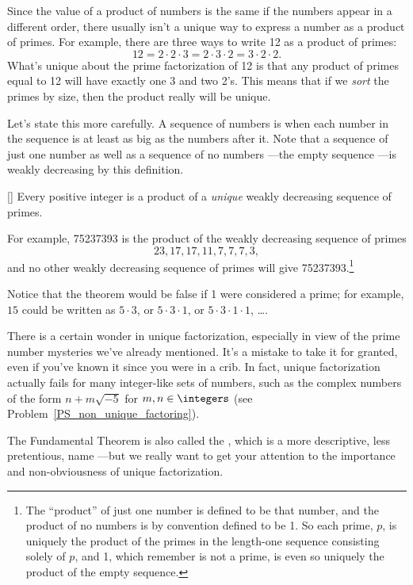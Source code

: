 Since the value of a product of numbers is the same if the numbers
appear in a different order, there usually isn't a unique way to
express a number as a product of primes.  For example, there are three
ways to write 12 as a product of primes:
\[
12 = 2 \cdot 2 \cdot 3 = 2 \cdot 3 \cdot 2 = 3 \cdot 2 \cdot 2.
\]
What's unique about the prime factorization of 12 is that any product
of primes equal to 12 will have exactly one 3 and two 2's.  This means
that if we \emph{sort} the primes by size, then the product really
will be unique.

Let's state this more carefully.  A sequence of numbers is
\emph{} when each number in the sequence is at
least as big as the numbers after it.  Note that a sequence of just
one number as well as a sequence of no numbers ---the empty sequence
---is weakly decreasing by this definition.

\begin{theorem}\label{thm:unique_factor}[]
Every positive integer is a product of a \emph{unique} weakly
decreasing sequence of primes.
\end{theorem}

For example, 75237393 is the product of the weakly decreasing sequence
of primes
\[
23, 17, 17, 11, 7, 7, 7, 3,
\]
and no other weakly decreasing sequence of primes will give
75237393.\footnote{The ``product'' of just one number is defined to be
  that number, and the product of no numbers is by convention defined
  to be 1.  So each prime, $p$, is uniquely the product of the primes
  in the length-one sequence consisting solely of $p$, and 1, which
  remember is not a prime, is even so uniquely the product of the
  empty sequence.}

Notice that the theorem would be false if 1 were considered a prime;
for example, $15$ could be written as $5 \cdot 3$, or $5 \cdot 3 \cdot
1$, or $5 \cdot 3 \cdot 1 \cdot 1$, \dots.

There is a certain wonder in unique factorization, especially in view
of the prime number mysteries we've already mentioned.  It's a mistake
to take it for granted, even if you've known it since you were in a
crib.  In fact, unique factorization actually fails for many
integer-like sets of numbers, such as the complex numbers of the
form $n + m\sqrt{-5}$ for $m,n \in \integers$ (see
Problem~\ref{PS_non_unique_factoring}).

The Fundamental Theorem is also called the , which is a more descriptive, less pretentious, name ---but
we really want to get your attention to the importance and
non-obviousness of unique factorization.

